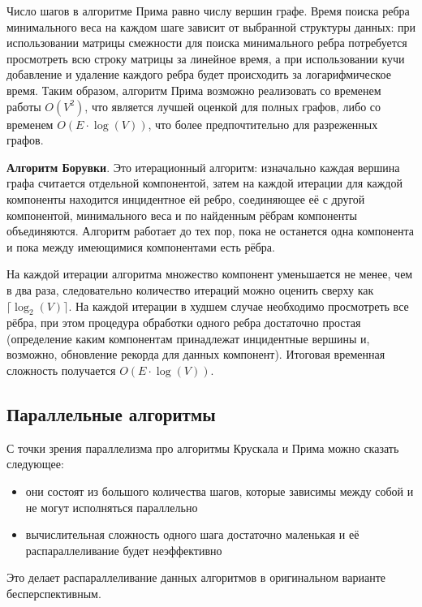 \documentclass[a4paper,10pt]{extarticle}
\begin{document}
Число шагов в алгоритме Прима равно числу вершин графе. Время поиска ребра минимального веса на каждом шаге зависит от выбранной структуры данных: при использовании матрицы смежности для поиска минимального ребра потребуется просмотреть всю строку матрицы за линейное время, а при использовании кучи добавление и удаление каждого ребра будет происходить за логарифмическое время. 
Таким образом, алгоритм Прима возможно реализовать со временем работы $O(V^2)$, что является лучшей оценкой для полных графов, либо со временем $O(E \cdot \log(V))$, что более предпочтительно для разреженных графов.


\textbf{Алгоритм Борувки}.
Это итерационный алгоритм: изначально каждая вершина графа считается отдельной компонентой, затем на каждой итерации для каждой компоненты находится инцидентное ей ребро, соединяющее её с другой компонентой, минимального веса и по найденным рёбрам компоненты объединяются. Алгоритм работает до тех пор, пока не останется одна компонента и пока между имеющимися компонентами есть рёбра.

На каждой итерации алгоритма множество компонент уменьшается не менее, чем в два раза, следовательно количество итераций можно оценить сверху как $\lceil \log_2(V) \rceil$. На каждой итерации в худшем случае необходимо просмотреть все рёбра, при этом процедура обработки одного ребра достаточно простая (определение каким компонентам принадлежат инцидентные вершины и, возможно, обновление рекорда для данных компонент). Итоговая временная сложность получается $O(E \cdot \log(V))$.

\subsection{Параллельные алгоритмы}

С точки зрения параллелизма про алгоритмы Крускала и Прима можно сказать следующее:
\begin{itemize}
	\item они состоят из большого количества шагов, которые зависимы между собой и не могут исполняться параллельно
	\item вычислительная сложность одного шага достаточно маленькая и её распараллеливание будет неэффективно
\end{itemize}
Это делает распараллеливание данных алгоритмов в оригинальном варианте бесперспективным. 
\end{document}
